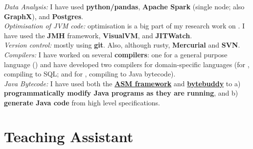 \documentclass[10pt]{article} %
\begin{document}
 {

  \textit{Data Analysis:} I have used \textbf{python/pandas},
  \textbf{Apache Spark} (single node; also \textbf{GraphX}), and \textbf{Postgres}.\\[1mm]
  \textit{Optimisation of JVM code:} optimisation is a big part of my research work on
  \secret{}. I have used the \textbf{JMH} framework, \textbf{VisualVM}, and \textbf{JITWatch}.\\[1mm]
  \textit{Version control:} mostly using \textbf{git}. Also, although rusty,
  \textbf{Mercurial} and \textbf{SVN}.\\[1mm]
  \textit{Compilers:} I have worked on several \textbf{compilers}: one for a
  general purpose language (\encore{}) and have developed two compilers for
  domain-specific languages (for \spencer{}, compiling to SQL; and for \secret{},
  compiling to
  Java bytecode).\\[1mm]
  \textit{Java Bytecode:} I have used both the \textbf{\href{foo}{ASM
      framework}} and \textbf{\href{https://bytebuddy.net}{bytebuddy}} to a)
  \textbf{programmatically modify Java programs as they are running}, and b)
  \textbf{generate Java code} from high level specifications.}

\section{Teaching Assistant}
\end{document}
